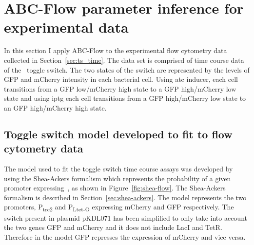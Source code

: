 %

\section{ABC-Flow parameter inference for experimental data}
 
In this section I apply ABC-Flow to the experimental flow cytometry data collected in Section~\ref{sec:ts_time}. The data set is comprised of time course data of the~\textcite{Litcofsky:2012gr} toggle switch. The two states of the switch are represented by the levels of GFP and mCherry intensity in each bacterial cell. Using \acrshort{atc} inducer, each cell transitions from a GFP low/mCherry high state to a GFP high/mCherry low state and using \acrshort{iptg} each cell transitions from a GFP high/mCherry low state to an GFP high/mCherry high state. 


\subsection{Toggle switch model developed to fit to flow cytometry data}
\label{sec:Real_model}
The model used to fit the toggle switch time course assays was developed by using the Shea-Ackers formalism which represents the probability of a given promoter expressing~\autocite{Ackers:1982tq}, as shown in Figure~\ref{fig:shea-flow}. The Shea-Ackers formalism is described in Section~\ref{sec:shea-ackers}. The model represents the two promoters, P\textsubscript{trc2} and P\textsubscript{Ltet-O} expressing mCherry and GFP respectively. The switch present in plasmid pKDL071 has been simplified to only take into account the two genes GFP and mCherry and it does not include LacI and TetR. Therefore in the model GFP represses the expression of mCherry and vice versa. 


